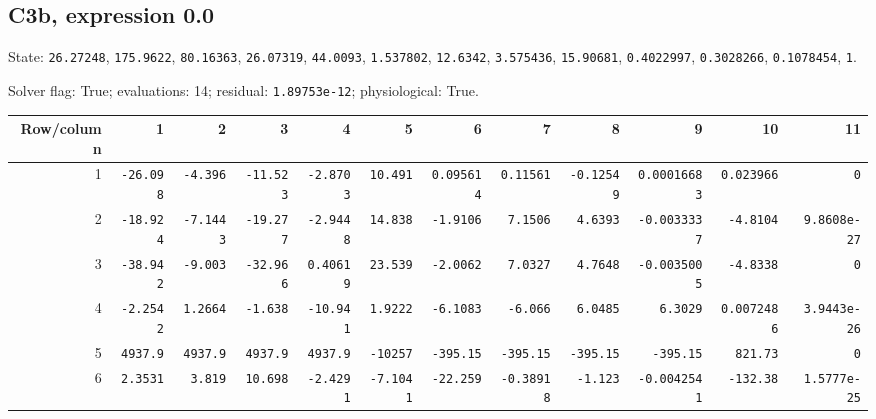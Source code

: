 \begin{landscape}
\subsection*{C3b, expression 0.0}
{\scriptsize State: \texttt{26.27248}, \texttt{175.9622}, \texttt{80.16363}, \texttt{26.07319}, \texttt{44.0093}, \texttt{1.537802}, \texttt{12.6342}, \texttt{3.575436}, \texttt{15.90681}, \texttt{0.4022997}, \texttt{0.3028266}, \texttt{0.1078454}, \texttt{1}.\par

Solver flag: True; evaluations: 14; residual: \texttt{1.89753e-12}; physiological: True.\par}

\begingroup\scriptsize\setlength{\tabcolsep}{3pt}\centering
\begin{tabular}{rrrrrrrrrrrr}\toprule

Row/column & 1 & 2 & 3 & 4 & 5 & 6 & 7 & 8 & 9 & 10 & 11 \\ \midrule

1 & \texttt{-26.098} & \texttt{-4.396} & \texttt{-11.523} & \texttt{-2.8703} & \texttt{10.491} & \texttt{0.095614} & \texttt{0.11561} & \texttt{-0.12549} & \texttt{0.00016683} & \texttt{0.023966} & \texttt{0} \\

2 & \texttt{-18.924} & \texttt{-7.1443} & \texttt{-19.277} & \texttt{-2.9448} & \texttt{14.838} & \texttt{-1.9106} & \texttt{7.1506} & \texttt{4.6393} & \texttt{-0.0033337} & \texttt{-4.8104} & \texttt{9.8608e-27} \\

3 & \texttt{-38.942} & \texttt{-9.003} & \texttt{-32.966} & \texttt{0.40619} & \texttt{23.539} & \texttt{-2.0062} & \texttt{7.0327} & \texttt{4.7648} & \texttt{-0.0035005} & \texttt{-4.8338} & \texttt{0} \\

4 & \texttt{-2.2542} & \texttt{1.2664} & \texttt{-1.638} & \texttt{-10.941} & \texttt{1.9222} & \texttt{-6.1083} & \texttt{-6.066} & \texttt{6.0485} & \texttt{6.3029} & \texttt{0.0072486} & \texttt{3.9443e-26} \\

5 & \texttt{4937.9} & \texttt{4937.9} & \texttt{4937.9} & \texttt{4937.9} & \texttt{-10257} & \texttt{-395.15} & \texttt{-395.15} & \texttt{-395.15} & \texttt{-395.15} & \texttt{821.73} & \texttt{0} \\

6 & \texttt{2.3531} & \texttt{3.819} & \texttt{10.698} & \texttt{-2.4291} & \texttt{-7.1041} & \texttt{-22.259} & \texttt{-0.38918} & \texttt{-1.123} & \texttt{-0.0042541} & \texttt{-132.38} & \texttt{1.5777e-25} \\


\end{tabular}
\end{landscape}
